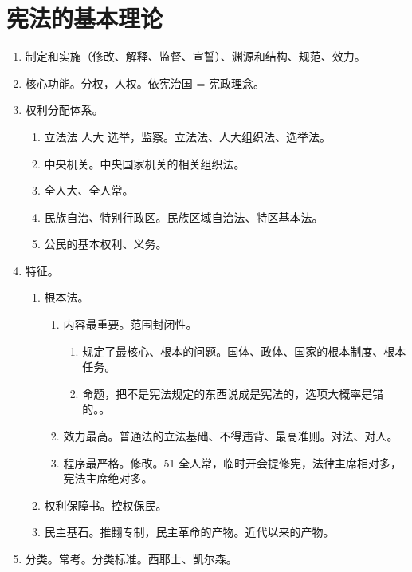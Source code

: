 \section{宪法的基本理论}
\begin{enumerate}
  \item 制定和实施（修改、解释、监督、宣誓）、渊源和结构、规范、效力。
  \item 核心功能。分权，人权。依宪治国 = 宪政理念。
  \item 权利分配体系。
        \begin{enumerate}
          \item 立法法 \yjt 人大 \yjt 选举，监察。立法法、人大组织法、选举法。
          \item 中央机关。中央国家机关的相关组织法。
          \item 全人大、全人常。
          \item 民族自治、特别行政区。民族区域自治法、特区基本法。
          \item 公民的基本权利、义务。
        \end{enumerate}
  \item 特征。
        \begin{enumerate}
          \item 根本法。
                \begin{enumerate}
                  \item 内容最重要。范围封闭性。
                        \begin{enumerate}
                          \item 规定了最核心、根本的问题。国体、政体、国家的根本制度、根本任务。
                          \item 命题，把不是宪法规定的东西说成是宪法的，选项大概率是错的。。
                        \end{enumerate}
                  \item 效力最高。普通法的立法基础、不得违背、最高准则。对法、对人。
                  \item 程序最严格。修改。51 全人常，临时开会提修宪，法律主席相对多，宪法主席绝对多。
                \end{enumerate}
          \item 权利保障书。控权保民。
          \item 民主基石。推翻专制，民主革命的产物。近代以来的产物。
        \end{enumerate}
  \item 分类。常考。分类标准。西耶士、凯尔森。
        \begin{enumerate}

\end{enumerate}
\end{enumerate}
